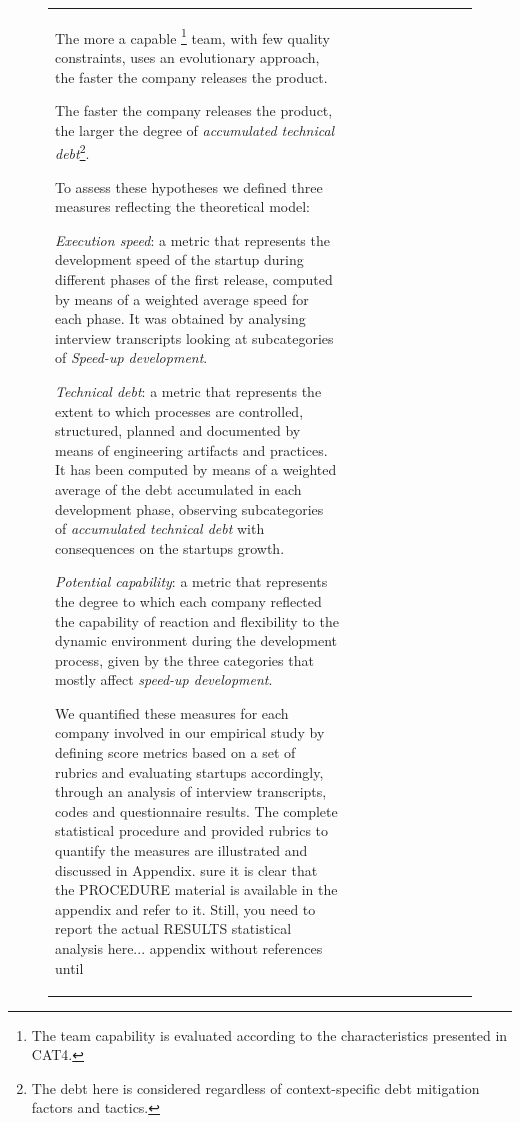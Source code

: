 \documentclass[12pt,journal,compsoc]{../sty/IEEEtran}
\begin{document}
\begin{table}[!t]
\begin{figure}[!t]
\begin{compactitem}
\begin{table}[!t]
\begin{tabular}{|l||c||c||c||c||c||c||c||c||c|}
\begin{compactenum} \item The more a capable \footnote{The team capability is
evaluated according  to the characteristics presented in CAT4.} team, with few
quality constraints,  uses an evolutionary approach, the faster the company
releases the product. \item The faster the company releases the product, the
larger the degree of  \textit{accumulated technical debt}\footnote{The debt here
is considered  regardless of context-specific debt mitigation factors and
tactics.}. \end{compactenum}

To assess these hypotheses we defined three measures reflecting the theoretical
model:

\begin{compactitem}

\item \textit{Execution speed}: a metric that represents the development speed
of the startup during different phases of the first release, computed by means
of a weighted average speed for each phase. It was obtained by analysing
interview transcripts looking at subcategories of \textit{Speed-up development}.

\item \textit{Technical debt}: a metric that represents the extent to which
processes are controlled, structured, planned and documented by means of
engineering artifacts and practices. It has been computed by means of a weighted
average of the debt accumulated in each development phase, observing
subcategories of  \textit{accumulated technical debt} with consequences on the
startups growth.

\item \textit{Potential capability}: a metric that represents the degree to
which each company reflected the capability of reaction and flexibility to the
dynamic environment during the development process, given by the three
categories that mostly affect \textit{speed-up development}. \end{compactitem}


We quantified these measures for each company involved in our empirical study
by defining score metrics based on a set of rubrics and evaluating startups
accordingly, through an analysis of interview transcripts, codes and
questionnaire results. The complete statistical procedure and provided rubrics
to quantify the measures are illustrated and discussed in Appendix. %
sure it is clear that the PROCEDURE material is available in the  %
appendix and refer to it. Still, you need to report the actual RESULTS  %
statistical analysis here...  %
appendix without references until  %


\end{tabular}
\end{table}
\end{compactitem}
\end{figure}
\end{table}
\end{document}
